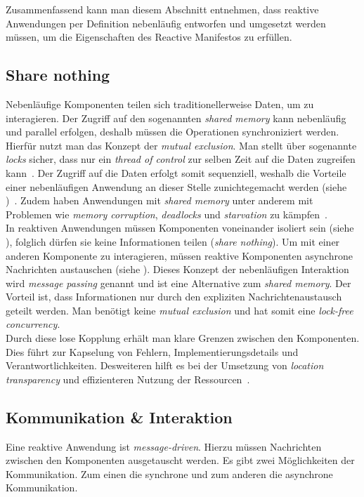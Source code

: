 Zusammenfassend kann man diesem Abschnitt entnehmen, dass reaktive Anwendungen per Definition nebenläufig entworfen und umgesetzt werden müssen, um die Eigenschaften des Reactive Manifestos zu erfüllen.

\pagebreak

\subsection{Share nothing}\label{subsec:sharenothing}
Nebenläufige Komponenten teilen sich traditionellerweise Daten, um zu interagieren. Der Zugriff auf den sogenannten \textit{shared memory} kann nebenläufig und parallel erfolgen, deshalb müssen die Operationen synchroniziert werden. Hierfür nutzt man das Konzept der \textit{mutual exclusion}. Man stellt über sogenannte \textit{locks} sicher, dass nur ein \textit{thread of control} zur selben Zeit auf die Daten zugreifen kann~\cite[S.~10]{butcher_seven_2014}. Der Zugriff auf die Daten erfolgt somit sequenziell, weshalb die Vorteile einer nebenläufigen Anwendung an dieser Stelle zunichtegemacht werden (siehe )~\cite[S.~45]{kuhn_reactive_2015}. Zudem haben Anwendungen mit \textit{shared memory} unter anderem mit Problemen wie \textit{memory corruption}, \textit{deadlocks} und \textit{starvation} zu kämpfen~\cite[S.~117]{vernon_reactive_2016}.\\
In reaktiven Anwendungen müssen Komponenten voneinander isoliert sein (siehe ), folglich dürfen sie keine Informationen teilen (\textit{share nothing}). Um mit einer anderen Komponente zu interagieren, müssen reaktive Komponenten asynchrone Nachrichten austauschen (siehe ). Dieses Konzept der nebenläufigen Interaktion wird \textit{message passing} genannt und ist eine Alternative zum \textit{shared memory}. Der Vorteil ist, dass Informationen nur durch den expliziten Nachrichtenaustausch geteilt werden. Man benötigt keine \textit{mutual exclusion} und hat somit eine \textit{lock-free concurrency}.\\
Durch diese lose Kopplung erhält man klare Grenzen zwischen den Komponenten. Dies führt zur Kapselung von Fehlern, Implementierungsdetails und Verantwortlichkeiten. Desweiteren hilft es bei der Umsetzung von \textit{location transparency} und effizienteren Nutzung der Ressourcen~\cite[S.~45]{kuhn_reactive_2015}.

\pagebreak

\subsection{Kommunikation \& Interaktion}
Eine reaktive Anwendung ist \textit{message-driven}. Hierzu müssen Nachrichten zwischen den Komponenten ausgetauscht werden. Es gibt zwei Möglichkeiten der Kommunikation. Zum einen die synchrone und zum anderen die asynchrone Kommunikation.

